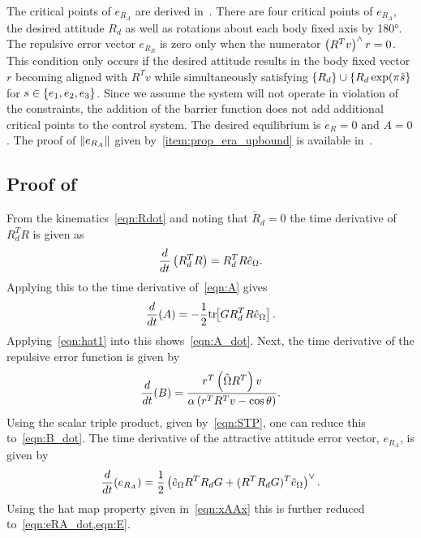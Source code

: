\documentclass[fleqn]{IJCAS}  %
\begin{document}
\begin{multicols}{2}
The critical points of \( e_{R_A} \) are derived in~\cite{bullo2004}.
There are four critical points of \( e_{R_A} \), the desired attitude \( R_d \) as well as rotations about each body fixed axis by \ang{180}.
The repulsive error vector \( e_{R_{B}} \) is zero only when the numerator \( \left( R^T v \right)^\wedge r = 0 \). 
This condition only occurs if the desired attitude results in the body fixed vector \( r \) becoming aligned with \(R^T v \) while simultaneously satisfying \(\left\{ R_d \right\} \cup \left\{ R_d \exp(\pi \hat{s} \right\} \) for \( s \in \left\{ e_1, e_2, e_3 \right\} \).
Since we assume the system will not operate in violation of the constraints, the addition of the barrier function does not add additional critical points to the control system.
The desired equilibrium is \( e_R = 0 \) and \( A = 0\).
The proof of \( \left\| e_{R_A} \right\| \) given by~\cref{item:prop_era_upbound} is available in~\cite{LeeITCST13}.

\subsection{Proof of~}\label{proof:error_dyn}
From the kinematics~\cref{eqn:Rdot} and noting that \( \dot{R}_d = 0 \) the time derivative of \( R_d^T R \) is given as
\begin{gather*}
	\frac{d }{d t} \left( R_d^T R \right) = R_d^T R \hat{e}_\Omega .
\end{gather*}
Applying this to the time derivative of~\cref{eqn:A} gives
\begin{gather*}
	\frac{d }{d t} (A) = -\frac{1}{2} \mathrm{tr}\negthickspace\left[ G R_d^T R \hat{e}_\Omega \right] .
\end{gather*}
Applying~\cref{eqn:hat1} into this shows~\cref{eqn:A_dot}.
Next, the time derivative of the repulsive error function is given by
\begin{gather*}
	\frac{d }{d t} (B) = \frac{r^T \left( \hat{\Omega} R^T \right) v}{\alpha \left( r^T R^T v - \cos \theta \right)} .
\end{gather*}
Using the scalar triple product, given by~\cref{eqn:STP}, one can reduce this to~\cref{eqn:B_dot}.
The time derivative of the attractive attitude error vector, \( e_{R_A} \), is given by
\begin{gather*}
	\frac{d }{d t} ( e_{R_A}) = \frac{1}{2} \left( \hat{e}_\Omega R^T R_d G + (R^T R_d G)^T \hat{e}_\Omega \right)^\vee .
\end{gather*}
Using the hat map property given in~\cref{eqn:xAAx} this is further reduced to~\cref{eqn:eRA_dot,eqn:E}.


\end{multicols}
\end{document}

